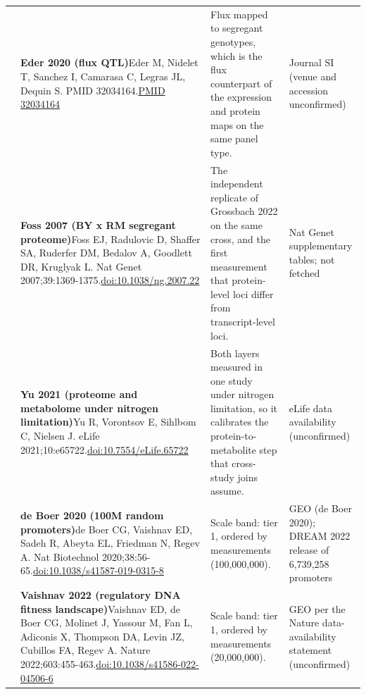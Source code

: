 \begin{landscape}
\begin{longtable}{@{}r@{\hspace{4pt}} L{86mm} L{92mm} L{62mm}@{}}
 & \textbf{Eder 2020 (flux QTL)}\newline Eder M, Nidelet T, Sanchez I, Camarasa C, Legras JL, Dequin S. PMID 32034164.\newline \href{https://pubmed.ncbi.nlm.nih.gov/32034164/}{PMID 32034164} & Flux mapped to segregant genotypes, which is the flux counterpart of the expression and protein maps on the same panel type. & Journal SI (venue and accession unconfirmed) \\
 & \textbf{Foss 2007 (BY x RM segregant proteome)}\newline Foss EJ, Radulovic D, Shaffer SA, Ruderfer DM, Bedalov A, Goodlett DR, Kruglyak L. Nat Genet 2007;39:1369-1375.\newline \href{https://doi.org/10.1038/ng.2007.22}{doi:10.1038/\allowbreak ng.2007.22} & The independent replicate of Grossbach 2022 on the same cross, and the first measurement that protein-level loci differ from transcript-level loci. & Nat Genet supplementary tables; not fetched \\
 & \textbf{Yu 2021 (proteome and metabolome under nitrogen limitation)}\newline Yu R, Vorontsov E, Sihlbom C, Nielsen J. eLife 2021;10:e65722.\newline \href{https://doi.org/10.7554/eLife.65722}{doi:10.7554/\allowbreak eLife.65722} & Both layers measured in one study under nitrogen limitation, so it calibrates the protein-to-metabolite step that cross-study joins assume. & eLife data availability (unconfirmed) \\
 & \textbf{de Boer 2020 (100M random promoters)}\newline de Boer CG, Vaishnav ED, Sadeh R, Abeyta EL, Friedman N, Regev A. Nat Biotechnol 2020;38:56-65.\newline \href{https://doi.org/10.1038/s41587-019-0315-8}{doi:10.1038/\allowbreak s41587-019-0315-8} & Scale band: tier 1, ordered by measurements (100,000,000). & GEO (de Boer 2020); DREAM 2022 release of 6,739,258 promoters \\
 & \textbf{Vaishnav 2022 (regulatory DNA fitness landscape)}\newline Vaishnav ED, de Boer CG, Molinet J, Yassour M, Fan L, Adiconis X, Thompson DA, Levin JZ, Cubillos FA, Regev A. Nature 2022;603:455-463.\newline \href{https://doi.org/10.1038/s41586-022-04506-6}{doi:10.1038/\allowbreak s41586-022-04506-6} & Scale band: tier 1, ordered by measurements (20,000,000). & GEO per the Nature data-availability statement (unconfirmed) \\

\end{longtable}
\end{landscape}
